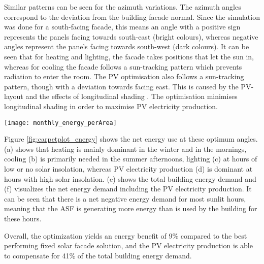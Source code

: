 	Similar patterns can be seen for the azimuth variations. The azimuth angles correspond to the deviation from the building facade normal. Since the simulation was done for a south-facing facade, this means an angle with a positive sign represents the panels facing towards south-east (bright colours), whereas negative angles represent the panels facing towards south-west (dark colours). It can be seen that for heating and lighting, the facade takes positions that let the sun in, whereas for cooling the facade follows a sun-tracking pattern which prevents radiation to enter the room. The PV optimisation also follows a sun-tracking pattern, though with a deviation towards facing east. This is caused by the PV-layout and the effects of longitudinal shading \cite{hofer2015PVSEC}. The optimisation minimises longitudinal shading in order to maximise PV electricity production. 

	\begin{figure*}[b!!]
		\begin{center}
		\texttt{[image: monthly\_energy\_perArea]}
		\caption{Carpet plots detailing the net energy consumption. Each square represents the total energy consumption for that specific hour of the entire month. Red colours detail the energy demand, while blue colours detail the energy supply.}
		\label{fig:carpetplot_energy}
		\end{center}
	\end{figure*}

	Figure \ref{fig:carpetplot_energy} shows the net energy use at these optimum angles. (a) shows that heating is mainly dominant in the winter and in the mornings, cooling (b) is primarily needed in the summer afternoons, lighting (c) at hours of low or no solar insolation, whereas PV electricity production (d) is dominant at hours with high solar insolation. (e) shows the total building energy demand and (f) visualizes the net energy demand including the PV electricity production. It can be seen that there is a net negative energy demand for most sunlit hours, meaning that the ASF is generating more energy than is used by the building for these hours. 

	Overall, the optimization yields an energy benefit of 9\% compared to the best performing fixed solar facade solution, and the PV electricity production is able to compensate for 41\% of the total building energy demand. 

	


